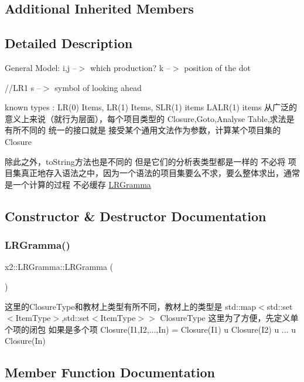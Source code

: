\subsection*{Additional Inherited Members}


\subsection{Detailed Description}
General Model\+: i,j --$>$ which production? k --$>$ position of the dot

//\+L\+R1 s --$>$ symbol of looking ahead

known types \+: L\+R(0) Items, L\+R(1) Items, S\+L\+R(1) items L\+A\+L\+R(1) items 从广泛的意义上来说（就行为层面），每个项目类型的 Closure,Goto,Analyse Table,求法是有所不同的 统一的接口就是 接受某个通用文法作为参数，计算某个项目集的\+Closure

除此之外，to\+String方法也是不同的 但是它们的分析表类型都是一样的 不必将 项目集真正地存入语法之中，因为一个语法的项目集要么不求，要么整体求出，通常是一个计算的过程 不必缓存 \hyperlink{classx2_1_1_l_r_gramma}{L\+R\+Gramma} 

\subsection{Constructor \& Destructor Documentation}
\mbox{\label{classx2_1_1_l_r_gramma_aaf38ee87d4dd3be25b48356f204ab17f}} 
\subsubsection{\texorpdfstring{L\+R\+Gramma()}{LRGramma()}}
{\footnotesize\ttfamily x2\+::\+L\+R\+Gramma\+::\+L\+R\+Gramma (\begin{DoxyParamCaption}{ }\end{DoxyParamCaption})\hspace{0.3cm}{\ttfamily [default]}}

这里的\+Closure\+Type和教材上类型有所不同，教材上的类型是 std\+::map$<$std\+::set$<$\+Item\+Type$>$,std\+::set$<$\+Item\+Type$>$$>$ Closure\+Type 这里为了方便，先定义单个项的闭包 如果是多个项 Closure(I1,I2,...,In) = Closure(\+I1) u Closure(\+I2) u ... u Closure(\+In) 

\subsection{Member Function Documentation}
\mbox{\label{classx2_1_1_l_r_gramma_a93fdb0ff53f9960980ff955b318e1883}} 
